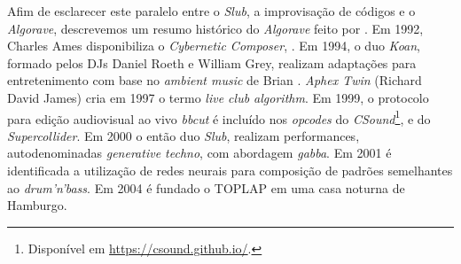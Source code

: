 Afim de esclarecer este paralelo entre o \emph{Slub}, a improvisação de códigos e o \emph{Algorave}, descrevemos um resumo histórico do \emph{Algorave} feito por . Em 1992, Charles Ames disponibiliza o \emph{Cybernetic Composer}, . Em 1994, o duo \emph{Koan}, formado pelos DJs Daniel Roeth e William Grey, realizam adaptações para entretenimento com base no \emph{ambient music} de Brian . \emph{Aphex Twin} (Richard David James) cria em 1997 o termo \emph{live club algorithm}. Em 1999, o protocolo para edição audiovisual ao vivo \emph{bbcut} \cite{collins_bbcut_2003} é incluído nos \emph{opcodes} do \emph{CSound}\footnote{Disponível em \url{https://csound.github.io/}.}, e do \emph{Supercollider}. Em 2000 o então duo \emph{Slub}, realizam performances, autodenominadas \emph{generative techno}, com abordagem \emph{gabba}. Em 2001 é identificada a utilização de redes neurais para composição de padrões semelhantes ao \emph{drum'n'bass}. Em 2004 é fundado o TOPLAP  em uma casa noturna de Hamburgo.



